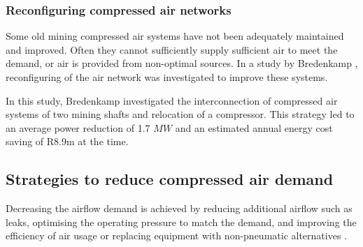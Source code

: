 		\subsubsection{Reconfiguring compressed air networks}
			Some old mining compressed air systems have not been adequately maintained and improved. Often they cannot sufficiently supply sufficient air to meet the demand, or air is provided from non-optimal sources. In a study by Bredenkamp \cite{Bredenkamp2013Masters}, reconfiguring of the air network was investigated to improve these systems.
			\par 
			In this study, Bredenkamp investigated the interconnection of compressed air systems of two mining shafts and relocation of a compressor. This strategy led to an average power reduction of 1.7 $MW$ and an estimated annual energy cost saving of R8.9m at the time.
			
	\subsection{Strategies to reduce compressed air demand}
	Decreasing the airflow demand is achieved by reducing additional airflow such as leaks, optimising the operating pressure to match the demand\footnotemark[2], and improving the efficiency of air usage or replacing equipment with non-pneumatic alternatives \cite{Snyman2011Masters}.
